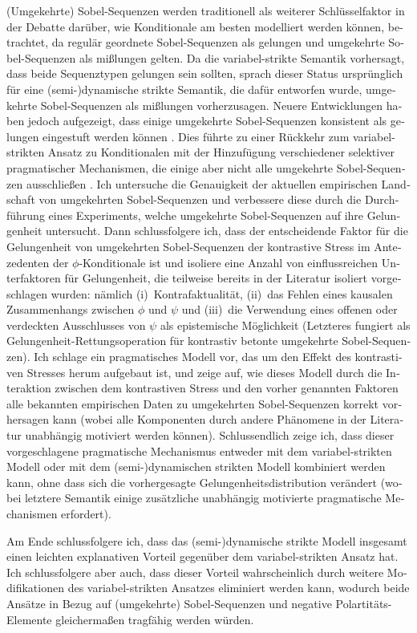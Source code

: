 \begin{otherlanguage}{ngerman}
(Umgekehrte) Sobel-Sequenzen werden traditionell als weiterer Schlüsselfaktor in der Debatte darüber, wie Konditionale am besten modelliert werden können, betrachtet, da regulär geordnete Sobel-Sequenzen als gelungen und umgekehrte Sobel-Sequenzen als mißlungen gelten. Da die variabel-strikte Semantik vorhersagt, dass beide Sequenztypen gelungen sein sollten, sprach dieser Status ursprünglich für eine \mbox{(semi-)}dynamische strikte Semantik, die dafür entworfen wurde, umgekehrte Sobel-\linebreak Sequenzen als mißlungen vorherzusagen. Neuere Entwicklungen haben jedoch aufgezeigt, dass einige umgekehrte Sobel-Sequenzen konsistent als gelungen eingestuft werden können \parencite[vgl.][]{Moss2012}. Dies führte zu einer Rückkehr zum variabel-strikten Ansatz zu Konditionalen mit der Hinzufügung verschiedener selektiver pragmatischer Mechanismen, die einige aber nicht alle umgekehrte Sobel-Sequenzen ausschließen \parencite[vgl.][]{Moss2012,Klecha2014,Klecha2015,Lewis2018,Krassnig2017,Krassnig2020,Krassnig2022,Ippolito2020}. Ich untersuche die Genauigkeit der aktuellen empirischen Landschaft von umgekehrten Sobel-Sequenzen und verbessere diese durch die Durchführung eines  Experiments, welche umgekehrte Sobel-Sequenzen auf ihre Gelungenheit untersucht. Dann schlussfolgere ich, dass der entscheidende Faktor für die Gelungenheit von umgekehrten Sobel-Sequenzen der kontrastive Stress im Antezedenten der $\phi$-Konditionale ist und isoliere eine Anzahl von einflussreichen Unterfaktoren für Gelungenheit, die teilweise bereits in der Literatur isoliert vorgeschlagen wurden: nämlich (i)~Kontrafaktualität, (ii)~das Fehlen eines kausalen Zusammenhangs zwischen $\phi$ und $\psi$ und (iii)~die Verwendung eines offenen oder verdeckten Ausschlusses von $\psi$ als epistemische Möglichkeit (Letzteres fungiert als Gelungenheit-Rettungsoperation für kontrastiv betonte umgekehrte Sobel-Sequenzen). Ich schlage ein pragmatisches Modell vor, das um den Effekt des kontrastiven Stresses herum aufgebaut ist, und zeige auf, wie dieses Modell durch die Interaktion zwischen dem kontrastiven Stress und den vorher genannten Faktoren alle bekannten empirischen Daten zu umgekehrten Sobel-Sequenzen korrekt vorhersagen kann (wobei alle Komponenten durch andere Phänomene in der Literatur unabhängig motiviert werden können). Schlussendlich zeige ich, dass dieser vorgeschlagene pragmatische Mechanismus entweder mit dem variabel-strikten Modell oder mit dem (semi-)dynamischen strikten Modell kombiniert werden kann, ohne dass sich die vorhergesagte Gelungenheitsdistribution verändert (wobei letztere Semantik einige zusätzliche unabhängig motivierte pragmatische Mechanismen erfordert).
    
Am Ende schlussfolgere ich, dass das (semi-)dynamische strikte Modell insgesamt einen leichten explanativen Vorteil gegenüber dem variabel-strikten Ansatz hat. Ich schlussfolgere aber auch, dass dieser Vorteil wahrscheinlich durch weitere Modifikationen des variabel-strikten Ansatzes eliminiert werden kann, wodurch beide Ansätze in Bezug auf (umgekehrte) Sobel-Sequenzen und negative Polartitäts-Elemente gleichermaßen tragfähig werden würden.
\end{otherlanguage}

